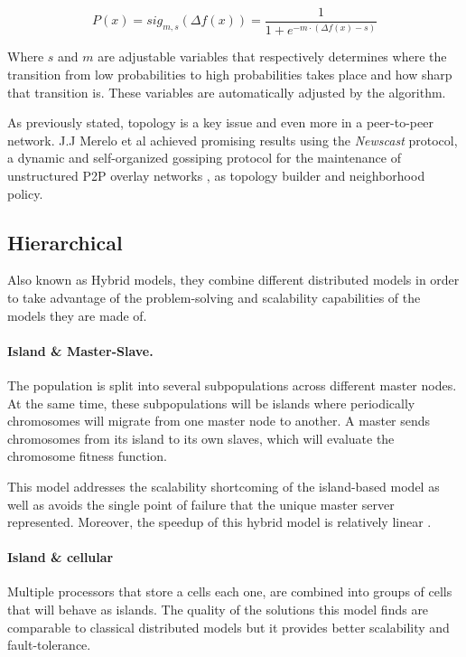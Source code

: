 \begin{equation}
    P(x) = sig_{m,s}(\Delta f(x)) = \frac{1}{1 + e^{-m \cdot (\Delta f(x)-s)}}
\end{equation}

Where $s$ and $m$ are adjustable variables that respectively determines where the transition from low probabilities to high probabilities takes place and how sharp that transition is. These variables are automatically adjusted by the algorithm.

As previously stated, topology is a key issue and even more in a peer-to-peer network. J.J Merelo et al \cite{evag} achieved promising results using the \textit{Newscast} protocol, a dynamic and self-organized gossiping protocol for the maintenance of unstructured P2P overlay networks \cite{newscast}, as topology builder and neighborhood policy.


\subsection{Hierarchical}
Also known as Hybrid models, they combine different distributed models in order to take advantage of the problem-solving and scalability capabilities of the models they are made of.

\paragraph*{Island \& Master-Slave.} The population is split into several subpopulations across different master nodes. At the same time, these subpopulations will be islands where periodically chromosomes will migrate from one master node to another. A master sends chromosomes from its island to its own slaves, which will evaluate the chromosome fitness function.

This model addresses the scalability shortcoming of the island-based model as well as avoids the single point of failure that the unique master server represented. Moreover, the speedup of this hybrid model is relatively linear \cite{13}.

\paragraph*{Island \& cellular} Multiple processors that store a cells each one, are combined into groups of cells that will behave as islands. The quality of the solutions this model finds are comparable to classical distributed models but it provides better scalability and fault-tolerance.

